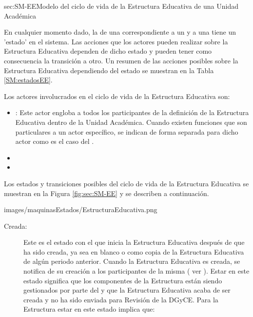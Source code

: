 \begin{Maquina}{sec:SM-EE}{Modelo del ciclo de vida de la Estructura Educativa de una Unidad Académica}{
En cualquier momento dado, la  de una  correspondiente a un  y a una  tiene un 'estado' en el sistema. Las acciones que los actores pueden realizar sobre la Estructura Educativa dependen de dicho estado y pueden tener como consecuencia la transición a otro. Un resumen de las acciones posibles sobre la Estructura Educativa dependiendo del estado se muestran en la Tabla \ref{SM:estadosEE}. 

Los actores involucrados en el ciclo de vida de la Estructura Educativa son:
\begin{itemize} 
	\item {}: Este actor engloba a todos los participantes de la definición de la Estructura Educativa dentro de la Unidad Académica. Cuando existen funciones que son particulares a un actor específico, se indican de forma separada para dicho actor como es el caso del .
	\item {}
	\item {}
\end{itemize}
 

Los estados y transiciones posibles del ciclo de vida de la Estructura Educativa se muestran en la Figura \ref{fig:sec:SM-EE} y se describen a continuación.	
}{images/maquinasEstados/EstructuraEducativa.png}

\begin{description}

\item[Creada:] Este es el estado con el que inicia la Estructura Educativa después de que ha sido creada, ya sea en blanco o como copia de la Estructura Educativa de algún periodo anterior. Cuando la Estructura Educativa es creada, se notifica de su creación a los participantes de la misma ( ver  ). Estar en este estado significa que los componentes de la Estructura están siendo gestionados por parte del  y que la Estructura Educativa acaba de ser creada y no ha sido enviada para Revisión de la DGyCE. Para la Estructura estar en este estado implica que:


\end{description}
\end{Maquina}
